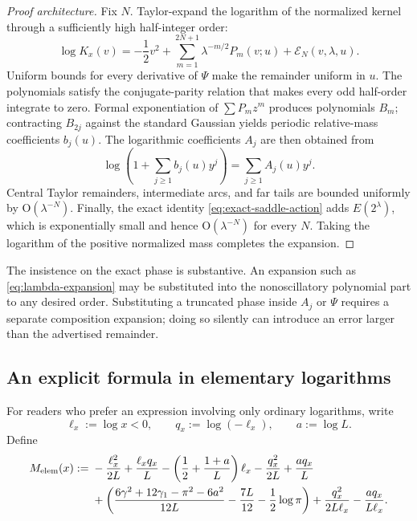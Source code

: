 \documentclass[11pt]{article}
\numberwithin{equation}{section}
\theoremstyle{definition}
\theoremstyle{remark}
\newcommand{\Oh}{\mathrm O}
\begin{document}
\begin{proof}[Proof architecture]
Fix $N$.  Taylor-expand the logarithm of the normalized kernel through a
sufficiently high half-integer order:
\begin{equation}\label{eq:all-order-kernel-exp}
 \log K_x(v)=-\frac12v^2+
 \sum_{m=1}^{2N+1}\lambda^{-m/2}P_m(v;u)
 +\mathcal E_N(v,\lambda,u).
\end{equation}
Uniform bounds for every derivative of $\Psi$ make the remainder uniform in
$u$.  The polynomials satisfy the conjugate-parity relation that makes every
odd half-order integrate to zero.  Formal exponentiation of
$\sum P_mz^m$ produces polynomials $B_m$; contracting $B_{2j}$ against the
standard Gaussian yields periodic relative-mass coefficients $b_j(u)$.
The logarithmic coefficients $A_j$ are then obtained from
\begin{equation}\label{eq:formal-log-coeff}
 \log\!\left(1+\sum_{j\ge1}b_j(u)y^j\right)
 =\sum_{j\ge1}A_j(u)y^j.
\end{equation}
Central Taylor remainders, intermediate arcs, and far tails are bounded
uniformly by $\Oh(\lambda^{-N})$.  Finally, the exact identity
\eqref{eq:exact-saddle-action} adds $E(2^\lambda)$, which is exponentially
small and hence $\Oh(\lambda^{-N})$ for every $N$.  Taking the logarithm of
the positive normalized mass completes the expansion.
\end{proof}

The insistence on the exact phase is substantive.  An expansion such as
\eqref{eq:lambda-expansion} may be substituted into the nonoscillatory
polynomial part to any desired order.  Substituting a truncated phase inside
$A_j$ or $\Psi$ requires a separate composition expansion; doing so silently
can introduce an error larger than the advertised remainder.

\subsection{An explicit formula in elementary logarithms}

For readers who prefer an expression involving only ordinary logarithms,
write
\begin{equation}\label{eq:elementary-log-notation}
 \ell_x:=\log x<0,
 \qquad q_x:=\log(-\ell_x),
 \qquad a:=\log L.
\end{equation}
Define
\begin{align}
 M_{\mathrm{elem}}(x):={}&
 -\frac{\ell_x^2}{2L}+\frac{\ell_xq_x}{L}
 -\left(\frac12+\frac{1+a}{L}\right)\ell_x
 -\frac{q_x^2}{2L}+\frac{a q_x}{L}
 \notag\\
 &+\left(
 \frac{6\gamma^2+12\gamma_1-\pi^2-6a^2}{12L}
 -\frac{7L}{12}-\frac12\log\pi\right)
 +\frac{q_x^2}{2L\ell_x}-\frac{a q_x}{L\ell_x}.
 \label{eq:M-elementary}
\end{align}
\end{document}
